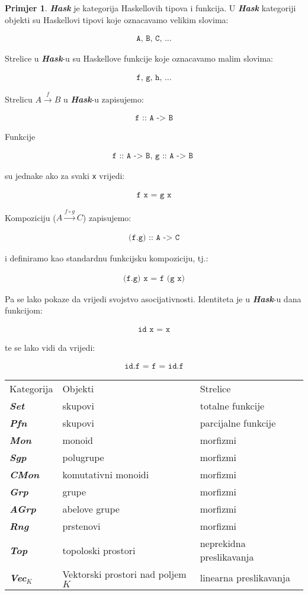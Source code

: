 \documentclass[11pt]{article}
\newcommand{\bold}[1]{\textbf{#1}}
\newcommand{\category}[1]{\bold{\emph{#1}}}
\newcommand{\code}[1]{
  \begin{align*}
    \texttt{#1}
  \end{align*}
  }
\theoremstyle{definition}
\newtheorem{primjer}{Primjer}
\begin{document}
  \begin{primjer} \category{Hask} je kategorija Haskellovih tipova i funkcija. U
  \category{Hask} kategoriji objekti su Haskellovi tipovi koje oznacavamo velikim
  slovima:
    \code{A, B, C, ...}
  Strelice u \category{Hask}-u su Haskellove funkcije koje oznacavamo malim
  slovima:
    \code{f, g, h, ...}
  Strelicu $A \xrightarrow{f} B$ u \category{Hask}-u zapisujemo:
    \code{f :: A -> B}
  Funkcije
    \code{
      f :: A -> B, g :: A -> B
      }
  su jednake ako za svaki \texttt{x} vrijedi:
    \code{ f x = g x }
  Kompoziciju ($A \xrightarrow{f \circ g} C$) zapisujemo:
    \code{(f.g) :: A -> C}
    i definiramo kao standardnu funkcijsku kompoziciju, tj.:
    \code{(f.g) x = f (g x)}
  Pa se lako pokaze da vrijedi svojstvo asocijativnosti.
  Identiteta je u \category{Hask}-u dana funkcijom:
    \code{ id x = x }
  te se lako vidi da vrijedi:
    \code{ id.f = f = id.f }
  \end{primjer}

  \begin{center}
  \begin{longtabu}{l l l}  \vspace{1em}
    Kategorija & Objekti & Strelice \\
      \category{Set} & skupovi & totalne funkcije \\
      \category{Pfn} & skupovi & parcijalne funkcije \\
      \category{Mon} & monoid & morfizmi \\
      \category{Sgp} & polugrupe & morfizmi \\
      \category{CMon} & komutativni monoidi & morfizmi \\
      \category{Grp} & grupe & morfizmi \\
      \category{AGrp} & abelove grupe & morfizmi \\
      \category{Rng} & prstenovi & morfizmi \\
      \category{Top} & topoloski prostori & neprekidna preslikavanja \\
      \category{Vec$_K$} & Vektorski prostori nad poljem $K$& linearna preslikavanja \\

    \end{longtabu}
  \end{center}
\end{document}
